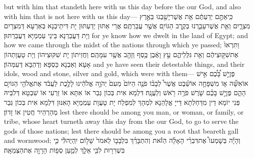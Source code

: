{but with him that standeth here with us this day before the \lord\space our God, and also with him that is not here with us this day—}{}
{כִּֽי\maqqaf אַתֶּ֣ם יְדַעְתֶּ֔ם אֵ֥ת אֲשֶׁר\maqqaf יָשַׁ֖בְנוּ בְּאֶ֣רֶץ מִצְרָ֑יִם וְאֵ֧ת אֲשֶׁר\maqqaf עָבַ֛רְנוּ בְּקֶ֥רֶב הַגּוֹיִ֖ם אֲשֶׁ֥ר עֲבַרְתֶּֽם׃}
{אֲרֵי אַתּוּן יְדַעְתּוּן יָת דִּיתֵיבְנָא בְּאַרְעָא דְּמִצְרָיִם וְיָת דַּעֲבַרְנָא בֵּינֵי עַמְמַיָּא דַּעֲבַרְתּוּן׃}
{for ye know how we dwelt in the land of Egypt; and how we came through the midst of the nations through which ye passed;}{}
{וַתִּרְאוּ֙ אֶת\maqqaf שִׁקּ֣וּצֵיהֶ֔ם וְאֵ֖ת גִּלֻּלֵיהֶ֑ם עֵ֣ץ וָאֶ֔בֶן כֶּ֥סֶף וְזָהָ֖ב אֲשֶׁ֥ר עִמָּהֶֽם׃}
{וַחֲזֵיתוֹן יָת שִׁקּוּצֵיהוֹן וְיָת טָעֲוָתְהוֹן אָעָא וְאַבְנָא כַּסְפָּא וְדַהְבָּא דְּעִמְּהוֹן׃}
{and ye have seen their detestable things, and their idols, wood and stone, silver and gold, which were with them—}{}
{פֶּן\maqqaf יֵ֣שׁ בָּ֠כֶ֠ם אִ֣ישׁ אוֹ\maqqaf אִשָּׁ֞ה א֧וֹ מִשְׁפָּחָ֣ה אוֹ\maqqaf שֵׁ֗בֶט אֲשֶׁר֩ לְבָב֨וֹ פֹנֶ֤ה הַיּוֹם֙ מֵעִם֙ יְהֹוָ֣ה אֱלֹהֵ֔ינוּ לָלֶ֣כֶת לַעֲבֹ֔ד אֶת\maqqaf אֱלֹהֵ֖י הַגּוֹיִ֣ם הָהֵ֑ם פֶּן\maqqaf יֵ֣שׁ בָּכֶ֗ם שֹׁ֛רֶשׁ פֹּרֶ֥ה רֹ֖אשׁ וְלַעֲנָֽה׃}
{דִּלְמָא אִית בְּכוֹן גְּבַר אוֹ אִתָּא אוֹ זַרְעִי אוֹ שִׁבְטָא דְּלִבֵּיהּ פְּנִי יוֹמָא דֵין מִדַּחְלְתָא דַּייָ אֱלָהַנָא לִמְהָךְ לְמִפְלַח יָת טָעֲוָת עַמְמַיָּא הָאִנּוּן דִּלְמָא אִית בְּכוֹן גְּבַר מְהַרְהֵיר חֲטִין אוֹ זָדוֹן׃}
{lest there should be among you man, or woman, or family, or tribe, whose heart turneth away this day from the \lord\space our God, to go to serve the gods of those nations; lest there should be among you a root that beareth gall and wormwood;}{}
{וְהָיָ֡ה בְּשׇׁמְעוֹ֩ אֶת\maqqaf דִּבְרֵ֨י הָאָלָ֜ה הַזֹּ֗את וְהִתְבָּרֵ֨ךְ בִּלְבָב֤וֹ לֵאמֹר֙ שָׁל֣וֹם יִֽהְיֶה\maqqaf לִּ֔י כִּ֛י בִּשְׁרִר֥וּת לִבִּ֖י אֵלֵ֑ךְ לְמַ֛עַן סְפ֥וֹת הָרָוָ֖ה אֶת\maqqaf הַצְּמֵאָֽה׃}
